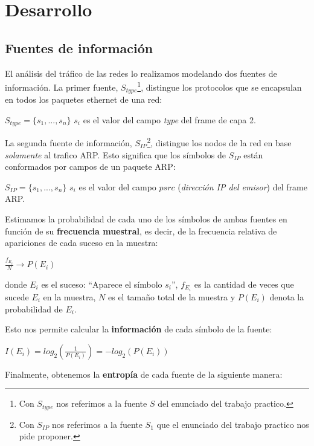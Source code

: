 \section{Desarrollo}

\subsection{Fuentes de información}
El análisis del tráfico de las redes lo realizamos modelando dos fuentes de información. La primer fuente, $S_{type}$\footnote{Con $S_{type}$ nos referimos a la fuente $S$ del enunciado del trabajo practico.}, distingue los protocolos que se encapsulan en todos los paquetes ethernet de una red:

\begin{center}
  $S_{type} = \{s_1, ..., s_n\}$ $s_i$ es el valor del campo \textit{type} del frame de capa 2.
\end{center}

La segunda fuente de información, $S_{IP}$\footnote{Con $S_{IP}$ nos referimos a la fuente $S_1$ que el enunciado del trabajo practico nos pide proponer.}, distingue los nodos de la red en base \textit{solamente} al trafico ARP. Esto significa que los símbolos de $S_{IP}$ están conformados por campos de un paquete ARP:
\begin{center}
  $S_{IP} = \{s_1, ..., s_n\}$ $s_i$ es el valor del campo $psrc$ (\textit{dirección IP del emisor}) del frame ARP.
\end{center}

Estimamos la probabilidad de cada uno de los símbolos de ambas fuentes en función de su \textbf{frecuencia muestral}, es decir, de la frecuencia relativa de apariciones de cada suceso en la muestra:
\begin{center}
$\frac{f_{E_i}}{N} \longrightarrow P(E_i)$
\end{center}
donde $E_i$ es el suceso: ``Aparece el símbolo $s_i$'', $f_{E_i}$ es la cantidad de veces que sucede $E_i$ en la muestra, $N$ es el tamaño total de la muestra y $P(E_i)$ denota la probabilidad de $E_i$.

Esto nos permite calcular la \textbf{información} de cada símbolo de la fuente:

\begin{center}
$I(E_i) = log_2(\frac{1}{P(E_i)}) = - log_2(P(E_i))$
\end{center}

Finalmente, obtenemos la \textbf{entropía} de cada fuente de la siguiente manera:

